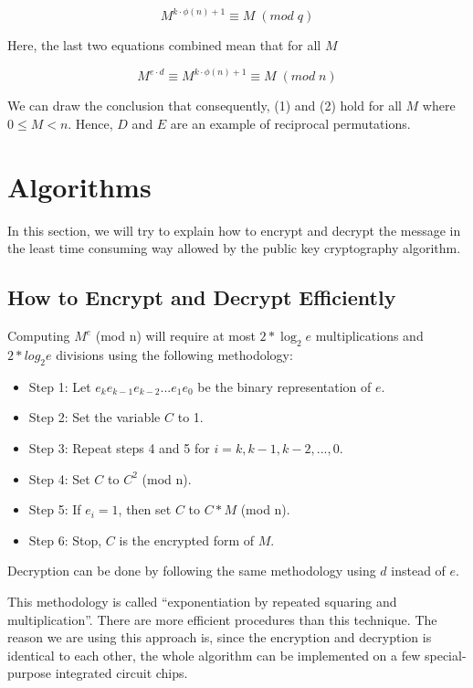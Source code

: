 \documentclass[12pt, letterpaper]{article}
\begin{document}
\[ M^{k \cdot \phi(n)+1} \equiv M \; (mod \; q) \]

Here, the last two equations combined mean that for all $M$ 

\[ M^{e \cdot d} \equiv M^{k \cdot \phi(n)+1} \equiv M \; (mod \; n) \]

We can draw the conclusion that consequently, (1) and (2) hold for all $M$ where $0 \leq M < n$. Hence, $D$ and $E$ are an example of reciprocal permutations.

\section{Algorithms}

In this section, we will try to explain how to encrypt and decrypt the message in the least time consuming way allowed by the public key cryptography algorithm.

\subsection{How to Encrypt and Decrypt Efficiently}

Computing $M^e$ (mod n) will require at most $2*\log_2 e$ multiplications and $2*log_2 e$ divisions using the following methodology:

\begin{spacing}{0.8}
  \begin{itemize}
    \setlength\itemsep{0em}
    \item[] Step 1: Let $e_ke_{k-1}e_{k-2}...e_1e_0$ be the binary representation of $e$.
    \item[] Step 2: Set the variable $C$ to 1.
    \item[] Step 3: Repeat steps 4 and 5 for $i = k, k-1, k-2, ..., 0$.
    \item[] Step 4: Set $C$ to $C^2$ (mod n).
    \item[] Step 5: If $e_i = 1$, then set $C$ to $C*M$ (mod n).
    \item[] Step 6: Stop, $C$ is the encrypted form of $M$.
  \end{itemize}
\end{spacing}
				
Decryption can be done by following the same methodology using $d$ instead of $e$.

This methodology is called “exponentiation by repeated squaring and multiplication”. There are more efficient procedures than this technique. The reason we are using this approach is, since the encryption and decryption is identical to each other, the whole algorithm can be implemented on a few special-purpose integrated circuit chips.
\end{document}
